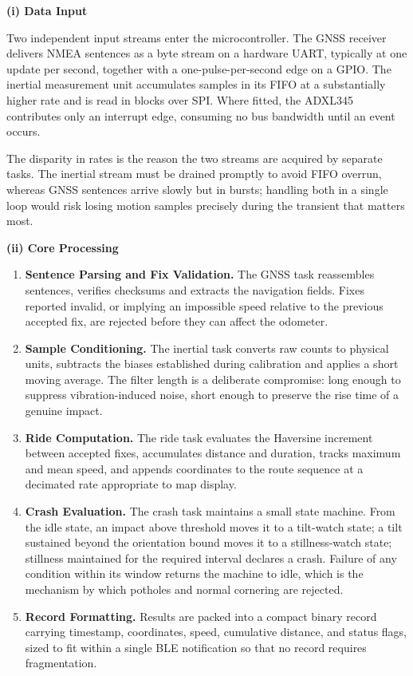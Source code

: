 \documentclass[12pt,a4paper,oneside]{report}
\begin{document}
\vspace{0.5em}
\noindent\textbf{(i) Data Input}

Two independent input streams enter the microcontroller. The GNSS receiver delivers NMEA
sentences as a byte stream on a hardware UART, typically at one update per second, together
with a one-pulse-per-second edge on a GPIO. The inertial measurement unit accumulates
samples in its FIFO at a substantially higher rate and is read in blocks over SPI. Where
fitted, the ADXL345 contributes only an interrupt edge, consuming no bus bandwidth until an
event occurs.

The disparity in rates is the reason the two streams are acquired by separate tasks. The
inertial stream must be drained promptly to avoid FIFO overrun, whereas GNSS sentences
arrive slowly but in bursts; handling both in a single loop would risk losing motion samples
precisely during the transient that matters most.

\vspace{0.5em}
\noindent\textbf{(ii) Core Processing}

\begin{enumerate}[leftmargin=*,itemsep=0.45em,topsep=0.5em]
\item \textbf{Sentence Parsing and Fix Validation.} The GNSS task reassembles sentences,
verifies checksums and extracts the navigation fields. Fixes reported invalid, or implying
an impossible speed relative to the previous accepted fix, are rejected before they can
affect the odometer.

\item \textbf{Sample Conditioning.} The inertial task converts raw counts to physical units,
subtracts the biases established during calibration and applies a short moving average. The
filter length is a deliberate compromise: long enough to suppress vibration-induced noise,
short enough to preserve the rise time of a genuine impact.

\item \textbf{Ride Computation.} The ride task evaluates the Haversine increment between
accepted fixes, accumulates distance and duration, tracks maximum and mean speed, and
appends coordinates to the route sequence at a decimated rate appropriate to map display.

\item \textbf{Crash Evaluation.} The crash task maintains a small state machine. From the
idle state, an impact above threshold moves it to a tilt-watch state; a tilt sustained
beyond the orientation bound moves it to a stillness-watch state; stillness maintained for
the required interval declares a crash. Failure of any condition within its window returns
the machine to idle, which is the mechanism by which potholes and normal cornering are
rejected.

\item \textbf{Record Formatting.} Results are packed into a compact binary record carrying
timestamp, coordinates, speed, cumulative distance, and status flags, sized to fit within a
single BLE notification so that no record requires fragmentation.
\end{enumerate}
\end{document}
